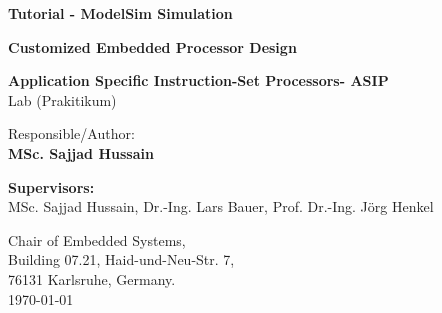\begin{titlepage}
\thispagestyle{empty}

\begin{center}
\hbox{}
\vfill

{\usesf\large
{\huge\bfseries Tutorial - ModelSim Simulation}
\vskip 2.5cm

{\LARGE\bfseries Customized Embedded Processor Design}
\vskip 0.25cm

{\large\bfseries Application Specific Instruction-Set Processors- ASIP\\}
Lab (Prakitikum)
\vskip 1.5cm

Responsible/Author:  \\
{\large\bfseries MSc. Sajjad Hussain\\}

}
\end{center}
\vskip 3cm

\textbf{Supervisors:}  \\
{MSc. Sajjad Hussain,  Dr.-Ing. Lars Bauer, Prof. Dr.-Ing. Jörg Henkel\\}

\vskip 2cm
Chair of Embedded Systems,\\
Building 07.21, Haid-und-Neu-Str. 7, \\
76131 Karlsruhe, Germany. \\

\vskip 1cm
\rightline\today

\vfill
\end{titlepage}

